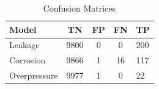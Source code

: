 \begin{table}[h]
\centering
\caption{Confusion Matrices}
\begin{tabular}{lccc}
\hline
Model & TN & FP & FN & TP \\
\hline
Leakage & 9800 & 0 & 0 & 200 \\
Corrosion & 9866 & 1 & 16 & 117 \\
Overpressure & 9977 & 1 & 0 & 22 \\
\hline
\end{tabular}
\label{tab:confusion}
\end{table}
